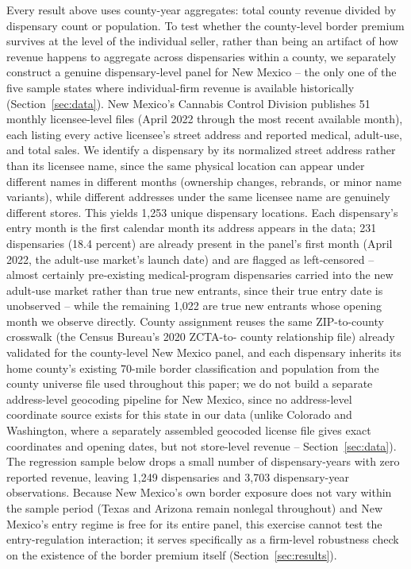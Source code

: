 \documentclass[12pt]{article}
\begin{document}
Every result above uses county-year aggregates: total county revenue divided by dispensary count or
population. To test whether the county-level border premium survives at the level of the individual seller,
rather than being an artifact of how revenue happens to aggregate across dispensaries within a county, we
separately construct a genuine dispensary-level panel for New Mexico -- the only one of the five sample states
where individual-firm revenue is available historically (Section~\ref{sec:data}). New Mexico's Cannabis Control
Division publishes 51 monthly licensee-level files (April 2022 through the most recent available month), each
listing every active licensee's street address and reported medical, adult-use, and total sales. We identify a
dispensary by its normalized street address rather than its licensee name, since the same physical location can
appear under different names in different months (ownership changes, rebrands, or minor name variants), while
different addresses under the same licensee name are genuinely different stores. This yields 1{,}253 unique
dispensary locations. Each dispensary's entry month is the first calendar month its address appears in the
data; 231 dispensaries (18.4 percent) are already present in the panel's first month (April 2022, the
adult-use market's launch date) and are flagged as left-censored -- almost certainly pre-existing
medical-program dispensaries carried into the new adult-use market rather than true new entrants, since their
true entry date is unobserved -- while the remaining 1{,}022 are true new entrants whose opening month we
observe directly. County assignment reuses the same ZIP-to-county crosswalk (the Census Bureau's 2020 ZCTA-to-
county relationship file) already validated for the county-level New Mexico panel, and each dispensary inherits
its home county's existing 70-mile border classification and population from the county universe file used
throughout this paper; we do not build a separate address-level geocoding pipeline for New Mexico, since no
address-level coordinate source exists for this state in our data (unlike Colorado and Washington, where a
separately assembled geocoded license file gives exact coordinates and opening dates, but not store-level
revenue -- Section~\ref{sec:data}). The regression sample below drops a small number of dispensary-years with
zero reported revenue, leaving 1{,}249 dispensaries and 3{,}703 dispensary-year observations. Because New
Mexico's own border exposure does not vary within the sample period (Texas and Arizona remain nonlegal
throughout) and New Mexico's entry regime is free for its entire panel, this exercise cannot test the
entry-regulation interaction; it serves specifically as a firm-level robustness check on the existence of the
border premium itself (Section~\ref{sec:results}).
\end{document}
